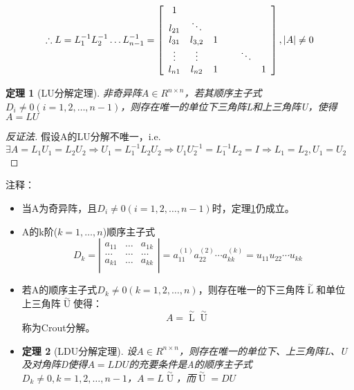 \documentclass[a4paper]{article}
\newtheorem{theorem}{定理}[section]
\begin{document}
$$
\therefore L = L^{-1}_{1}L^{-1}_{2}\dots L^{-1}_{n-1} = \left[
\begin{array}{c c c c c c}
1 & ~ & ~ & ~ & ~ & ~ \\
l_{21} & \ddots & ~ & ~ & ~ & ~ \\
l_{31} & l_{3, 2} & 1 & ~ & ~ & ~ \\
\vdots & \vdots & ~ & ~ & \ddots & ~ \\
l_{n1} & l_{n2} & 1 & ~ & ~ &1 \\
\end{array}
\right], |A| \neq 0
$$

\begin{theorem}[LU分解定理]
\label{th_lu}
非奇异阵$A\in R^{n\times n}$，若其顺序主子式$D_i \neq 0 (i = 1, 2, \dots, n-1)$，则存在唯一的单位下三角阵L和上三角阵U，使得$A=LU$
\end{theorem}
\begin{proof}[反证法]
假设A的LU分解不唯一，i.e. $\exists A=L_1U_1 = L_2U_2 \Rightarrow U_1 = L_1^{-1}L_2U_2\Rightarrow U_1 U_2^{-1}=L_1^{-1}L_2 = I \Rightarrow L_1 = L_2, U_1 = U_2$
\end{proof}
注释：
\begin{itemize}
\item 当A为奇异阵，且$D_i \neq 0 (i = 1, 2, \dots, n-1)$时，定理\ref{th_lu}仍成立。
\item A的k阶($k=1, \dots, n$)顺序主子式
$$D_k = \left|
\begin{matrix}
a_{11} & \dots & a_{1k} \\
\dots & \dots & \dots \\
a_{k1} & \dots & a_{kk} \\
\end{matrix}
\right| = a^{(1)}_{11}a^{(2)}_{22}\cdots a^{(k)}_{kk} = u_{11}u_{22}\cdots u_{kk}
$$
\item 若A的顺序主子式$D_k \neq 0 (k=1, 2, \dots, n)$，则存在唯一的下三角阵${\mathop L\limits^{\sim}}$和单位上三角阵${\mathop U\limits^{\sim}}$使得：
\begin{equation*}
A={\mathop L\limits^{\sim}}{\mathop U\limits^{\sim}}
\end{equation*} 
称为Crout分解。
\item \begin{theorem}[LDU分解定理]
设$A \in R^{n\times n}$，则存在唯一的单位下、上三角阵L、U及对角阵D使得$A=LDU$的充要条件是A的顺序主子式$D_k \neq 0, k=1,2,\dots, n-1$，$A=L{\mathop U\limits^{\sim}}$，而${\mathop U\limits^{\sim}} = DU$
\end{theorem}
\end{itemize}
\end{document}
